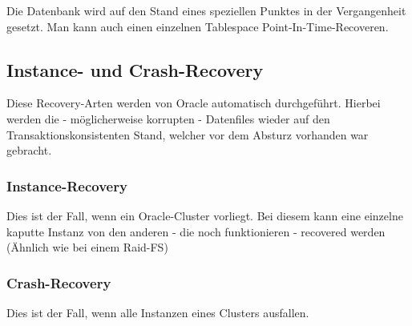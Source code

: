Die Datenbank wird auf den Stand eines speziellen Punktes in der Vergangenheit gesetzt. Man kann auch einen einzelnen Tablespace Point-In-Time-Recoveren.

\subsection{Instance- und Crash-Recovery}

Diese Recovery-Arten werden von Oracle automatisch durchgeführt. Hierbei werden die - möglicherweise korrupten - Datenfiles wieder auf den Transaktionskonsistenten Stand, welcher vor dem Absturz vorhanden war gebracht.

\subsubsection{Instance-Recovery}

Dies ist der Fall, wenn ein Oracle-Cluster vorliegt. Bei diesem kann eine einzelne kaputte Instanz von den anderen - die noch funktionieren - recovered werden (Ähnlich wie bei einem Raid-FS)

\subsubsection{Crash-Recovery}

Dies ist der Fall, wenn alle Instanzen eines Clusters ausfallen.